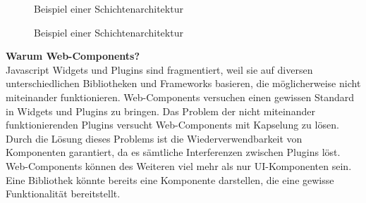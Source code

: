 \begin{figure}[h]
\centering
\caption[
Beispiel von Web-Components im Browser an Hand von dem Datepicker, Urldate: 04.2014 \newline
]{Beispiel einer Schichtenarchitektur}
\label{fig:3_Datepicker_Visuals}
\end{figure}

\begin{figure}[h]
\centering
\caption[
Beispiel von Web-Components im Browser an Hand von dem Datepicker, Urldate: 04.2014 \newline
]{Beispiel einer Schichtenarchitektur}
\label{fig:3_Datepicker_Source}
\end{figure}

\textbf{Warum Web-Components?}\\
Javascript Widgets und Plugins sind fragmentiert, weil sie auf diversen unterschiedlichen Bibliotheken und Frameworks basieren, die möglicherweise nicht miteinander funktionieren. Web-Components versuchen einen gewissen Standard in Widgets und Plugins zu bringen. Das Problem der nicht miteinander funktionierenden Plugins versucht Web-Components mit Kapselung zu lösen. Durch die Lösung dieses Problems ist die Wiederverwendbarkeit von Komponenten garantiert, da es sämtliche Interferenzen zwischen Plugins löst. Web-Components können des Weiteren viel mehr als nur UI-Komponenten sein. Eine Bibliothek könnte bereits eine Komponente darstellen, die eine gewisse Funktionalität bereitstellt.

